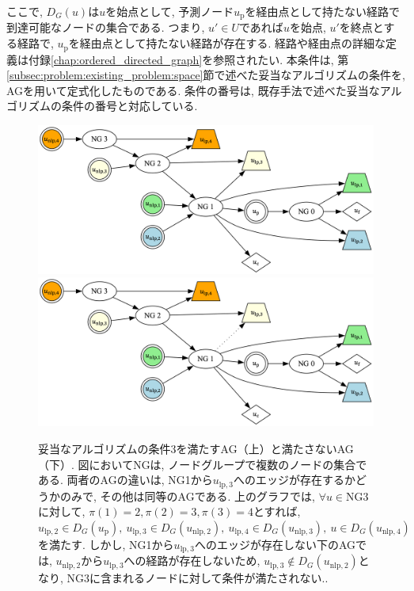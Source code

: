 \documentclass[11pt,oneside,openany,report]{jsbook}
\begin{document}
\noindent
ここで, $D_G(u)$は$u$を始点として, 予測ノード$u_\mathrm{p}$を経由点として持たない経路で到達可能なノードの集合である. つまり, $u' \in U$であれば$u$を始点, $u'$を終点とする経路で, $u_\mathrm{p}$を経由点として持たない経路が存在する. 経路や経由点の詳細な定義は付録\ref{chap:ordered_directed_graph}を参照されたい. 本条件は, 第\ref{subsec:problem:existing_problem:space}節で述べた妥当なアルゴリズムの条件を, AGを用いて定式化したものである. 条件の番号は, 既存手法で述べた妥当なアルゴリズムの条件の番号と対応している.

\begin{figure}
  \includegraphics[width=14cm]{mgg_automl_zero_vag/ag/valid_lp.png}
  \includegraphics[width=14cm]{mgg_automl_zero_vag/ag/invalid_lp.png}
  \caption{妥当なアルゴリズムの条件3を満たすAG（上）と満たさないAG（下）. 図においてNGは, ノードグループで複数のノードの集合である. 両者のAGの違いは, NG1から$u_{\mathrm{lp}, 3}$へのエッジが存在するかどうかのみで, その他は同等のAGである. 上のグラフでは, $\forall u \in \mathrm{NG3}$に対して, $\pi(1) = 2, \pi(2) = 3, \pi(3) = 4$とすれば, $u_{\mathrm{lp}, 2} \in D_G(u_\mathrm{p}),\ u_{\mathrm{lp}, 3} \in D_G(u_{\mathrm{nlp}, 2}),\ u_{\mathrm{lp}, 4} \in D_G(u_{\mathrm{nlp},3}),\ u \in D_G(u_{\mathrm{nlp}, 4})$を満たす. しかし, NG1から$u_{\mathrm{lp}, 3}$へのエッジが存在しない下のAGでは, $u_{\mathrm{nlp}, 2}$から$u_{\mathrm{lp}, 3}$への経路が存在しないため, $u_{\mathrm{lp}, 3} \not\in D_G(u_{\mathrm{nlp}, 2})$となり, NG3に含まれるノードに対して条件が満たされない..}
  \label{fig:mgg_automl_zero_vag:lp_validity}
\end{figure}
\end{document}
